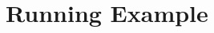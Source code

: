 \documentclass{llncs}
\newcommand{\ms}[1]{\texttt{#1}}
\begin{document}


\section{Running Example}
\end{document}
